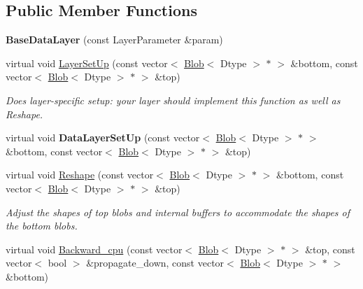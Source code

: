 \subsection*{Public Member Functions}
\begin{DoxyCompactItemize}
\item 
{\bfseries Base\+Data\+Layer} (const Layer\+Parameter \&param)\hypertarget{classcaffe_1_1BaseDataLayer_abf8b0153155bc04864ebeeb4c117d7a1}{}\label{classcaffe_1_1BaseDataLayer_abf8b0153155bc04864ebeeb4c117d7a1}

\item 
virtual void \hyperlink{classcaffe_1_1BaseDataLayer_a15f0c368230549ece6b91764704c9a73}{Layer\+Set\+Up} (const vector$<$ \hyperlink{classcaffe_1_1Blob}{Blob}$<$ Dtype $>$ $\ast$ $>$ \&bottom, const vector$<$ \hyperlink{classcaffe_1_1Blob}{Blob}$<$ Dtype $>$ $\ast$ $>$ \&top)
\begin{DoxyCompactList}\small\item\em Does layer-\/specific setup\+: your layer should implement this function as well as Reshape. \end{DoxyCompactList}\item 
virtual void {\bfseries Data\+Layer\+Set\+Up} (const vector$<$ \hyperlink{classcaffe_1_1Blob}{Blob}$<$ Dtype $>$ $\ast$ $>$ \&bottom, const vector$<$ \hyperlink{classcaffe_1_1Blob}{Blob}$<$ Dtype $>$ $\ast$ $>$ \&top)\hypertarget{classcaffe_1_1BaseDataLayer_a1c36ceb4162df320f1b9a41d289c8a8b}{}\label{classcaffe_1_1BaseDataLayer_a1c36ceb4162df320f1b9a41d289c8a8b}

\item 
virtual void \hyperlink{classcaffe_1_1BaseDataLayer_af2e62c1e0eee2b673973874c861df406}{Reshape} (const vector$<$ \hyperlink{classcaffe_1_1Blob}{Blob}$<$ Dtype $>$ $\ast$ $>$ \&bottom, const vector$<$ \hyperlink{classcaffe_1_1Blob}{Blob}$<$ Dtype $>$ $\ast$ $>$ \&top)
\begin{DoxyCompactList}\small\item\em Adjust the shapes of top blobs and internal buffers to accommodate the shapes of the bottom blobs. \end{DoxyCompactList}\item 
virtual void \hyperlink{classcaffe_1_1BaseDataLayer_ac0e1c8936407164b04aa98c11c36a22c}{Backward\+\_\+cpu} (const vector$<$ \hyperlink{classcaffe_1_1Blob}{Blob}$<$ Dtype $>$ $\ast$ $>$ \&top, const vector$<$ bool $>$ \&propagate\+\_\+down, const vector$<$ \hyperlink{classcaffe_1_1Blob}{Blob}$<$ Dtype $>$ $\ast$ $>$ \&bottom)\hypertarget{classcaffe_1_1BaseDataLayer_ac0e1c8936407164b04aa98c11c36a22c}{}\label{classcaffe_1_1BaseDataLayer_ac0e1c8936407164b04aa98c11c36a22c}


\end{DoxyCompactItemize}

